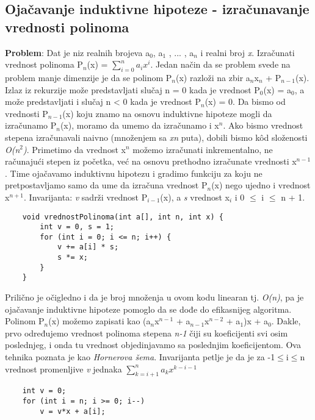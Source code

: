 \documentclass{article}
\begin{document}
\subsection{Ojačavanje induktivne hipoteze - izračunavanje vrednosti polinoma}
\textbf{Problem}: Dat je niz realnih brojeva a$_0$, a$_1$ , ... , a$_n$ i realni broj \textit{x}. Izračunati vrednost polinoma 
P$_n$(x) = $\sum_{i=0}^{n} a_ix^i$.
\newline Jedan način da se problem svede na problem manje dimenzije je da se polinom P$_n$(x) razloži na zbir a$_n$x$_n$ + 
P$_{n-1}$(x). Izlaz iz rekurzije može predstavljati slučaj
n = 0 kada je vrednost P$_0$(x) = a$_0$, a može predstavljati i slučaj n < 0 kada je vrednost P$_n$(x) = 0. Da bismo od vrednosti P$_{n-1}$(x) koju znamo na osnovu induktivne hipoteze
mogli da izračunamo P$_n$(x), moramo da umemo da izračunamo i x$^n$. 
\newline Ako bismo vrednost stepena izračunavali naivno (množenjem sa \textit{xn} puta), dobili bismo kôd složenosti \textit{O(n$^2$)}.
\newline Primetimo da vrednost x$^n$ možemo
izračunati inkrementalno, ne računajući stepen iz početka, već na osnovu
prethodno izračunate vrednosti x$^{n-1}$. Time ojačavamo induktivnu hipotezu
i gradimo funkciju za koju ne pretpostavljamo samo da ume da izračuna vrednost P$_n$(x) nego ujedno i vrednost x$^{n+1}$.
Invarijanta: \textit{v} sadrži vrednost P$_{i-1}$(x), a
\textit{s} vrednost x$_i$ i 0 $\leq$ i $\leq$ n + 1.
\begin{lstlisting}
    void vrednostPolinoma(int a[], int n, int x) {
        int v = 0, s = 1;
        for (int i = 0; i <= n; i++) { 
            v += a[i] * s;
            s *= x;
        }
    }
\end{lstlisting}
Prilično je očigledno i da je broj množenja u ovom kodu linearan tj. \textit{O(n)}, pa je
ojačavanje induktivne hipoteze pomoglo da se dođe do efikasnijeg algoritma.
\newline Polinom P$_n$(x) možemo
zapisati kao (a$_n$x$^{n-1}$ + a$_{n-1}$x$^{n-2}$ + a$_1$)x + a$_0$. Dakle, prvo određujemo vrednost polinoma stepena \textit{n-1} čiji su koeficijenti svi osim poslednjeg, i onda tu
vrednost objedinjavamo sa poslednjim koeficijentom. Ova tehnika poznata je kao \textit{Hornerova šema}. Invarijanta petlje je da je za -1$\leq$i$\leq$n vrednost promenljive \textit{v} jednaka
$\sum_{k=i+1}^{n} a_kx^{k-i-1}$
\begin{lstlisting}
    int v = 0;
    for (int i = n; i >= 0; i--)
        v = v*x + a[i];
\end{lstlisting}
\end{document}
